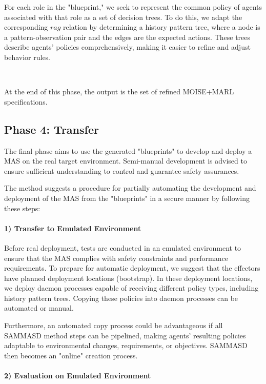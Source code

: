 \documentclass[sigconf,anonymous]{aamas}
\begin{document}
For each role in the "blueprint," we seek to represent the common policy of agents associated with that role as a set of decision trees. To do this, we adapt the corresponding $rag$ relation by determining a history pattern tree, where a node is a pattern-observation pair and the edges are the expected actions. These trees describe agents' policies comprehensively, making it easier to refine and adjust behavior rules.

\

At the end of this phase, the output is the set of refined MOISE+MARL specifications.

\subsection{Phase 4: Transfer}

The final phase aims to use the generated "blueprints" to develop and deploy a MAS on the real target environment. Semi-manual development is advised to ensure sufficient understanding to control and guarantee safety assurances.

The method suggests a procedure for partially automating the development and deployment of the MAS from the "blueprints" in a secure manner by following these steps:

\paragraph{\textbf{1) Transfer to Emulated Environment}}

Before real deployment, tests are conducted in an emulated environment to ensure that the MAS complies with safety constraints and performance requirements. To prepare for automatic deployment, we suggest that the effectors have planned deployment locations (bootstrap). In these deployment locations, we deploy daemon processes capable of receiving different policy types, including history pattern trees. Copying these policies into daemon processes can be automated or manual.

Furthermore, an automated copy process could be advantageous if all SAMMASD method steps can be pipelined, making agents' resulting policies adaptable to environmental changes, requirements, or objectives. SAMMASD then becomes an "online" creation process.

\paragraph{\textbf{2) Evaluation on Emulated Environment}}
\end{document}
